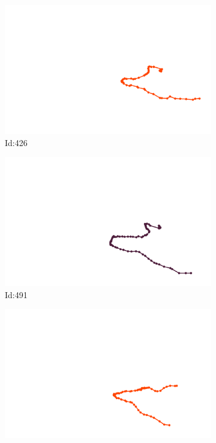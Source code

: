 \documentclass[12pt,twoside]{report}
\begin{document}
\begin{figure}
\centering
\begin{subfigure}[b]{0.20\textwidth}
\centering
\includegraphics[width=\textwidth]{../../trajectories/426.png}
\caption{Id:426}
\end{subfigure}
\begin{subfigure}[b]{0.20\textwidth}
\centering
\includegraphics[width=\textwidth]{../../trajectories/491.png}
\caption{Id:491}
\end{subfigure}
\begin{subfigure}[b]{0.20\textwidth}
\centering
\includegraphics[width=\textwidth]{../../trajectories/562.png}

\end{subfigure}
\end{figure}
\end{document}
